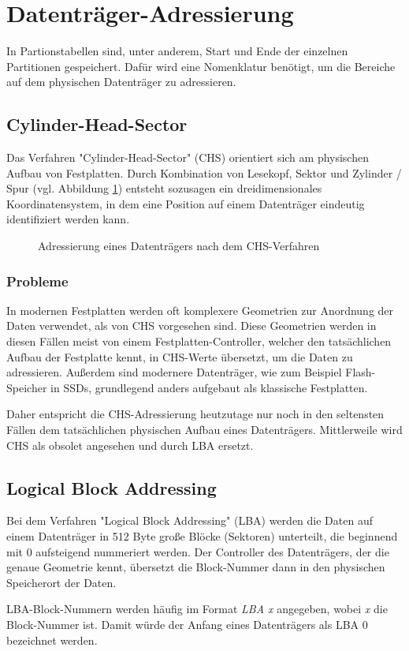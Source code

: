 \section{Datenträger-Adressierung}
\label{sec:addressing}
In Partionstabellen sind, unter anderem, Start und Ende der einzelnen Partitionen gespeichert.
Dafür wird eine Nomenklatur benötigt, um die Bereiche auf dem physischen Datenträger zu adressieren.

\subsection{Cylinder-Head-Sector}
Das Verfahren "Cylinder-Head-Sector" (CHS) orientiert sich am physischen Aufbau von Festplatten.
Durch Kombination von Lesekopf, Sektor und Zylinder / Spur (vgl. Abbildung \ref{fig:chs}) entsteht sozusagen ein dreidimensionales Koordinatensystem, in dem eine Position auf einem Datenträger eindeutig identifiziert werden kann.

\begin{figure}[ht]
    \centering
    \fbox{}
    \caption{Adressierung eines Datenträgers nach dem CHS-Verfahren}
    \label{fig:chs}
\end{figure}

\subsubsection{Probleme}
In modernen Festplatten werden oft komplexere Geometrien zur Anordnung der Daten verwendet, als von CHS vorgesehen sind.
Diese Geometrien werden in diesen Fällen meist von einem Festplatten-Controller, welcher den tatsächlichen Aufbau der Festplatte kennt, in CHS-Werte übersetzt, um die Daten zu adressieren.\cite{pollard2011}
Außerdem sind modernere Datenträger, wie zum Beispiel Flash-Speicher in SSDs, grundlegend anders aufgebaut als klassische Festplatten.

Daher entspricht die CHS-Adressierung heutzutage nur noch in den seltensten Fällen dem tatsächlichen physischen Aufbau eines Datenträgers. 
Mittlerweile wird CHS als obsolet angesehen und durch LBA ersetzt.


\subsection{Logical Block Addressing}
\label{sec:addressing:lba}
Bei dem Verfahren "Logical Block Addressing" (LBA) werden die Daten auf einem Datenträger in 512 Byte große Blöcke (Sektoren) unterteilt, die beginnend mit 0 aufsteigend nummeriert werden.
Der Controller des Datenträgers, der die genaue Geometrie kennt, übersetzt die Block-Nummer dann in den physischen Speicherort der Daten.

LBA-Block-Nummern werden häufig im Format \textit{LBA x} angegeben, wobei \textit{x} die Block-Nummer ist.
Damit würde der Anfang eines Datenträgers als LBA 0 bezeichnet werden.
